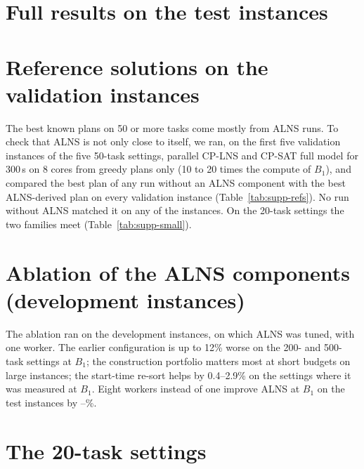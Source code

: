 \documentclass[10pt]{article}
\begin{document}
\section{Full results on the test instances}
\label{sec:s-full}



{\footnotesize\setlength{\tabcolsep}{3.4pt}}

\section{Reference solutions on the validation instances}
\label{sec:s-refs}



The best known plans on 50 or more tasks come mostly from ALNS runs. To check that ALNS is not only close to itself,
we ran, on the first five validation instances of the five 50-task settings, parallel CP-LNS and CP-SAT full model
for 300\,s on 8 cores from greedy plans only (10 to 20 times the compute of $B_1$), and compared the best plan of any
run without an ALNS component with the best ALNS-derived plan on every validation instance (Table~\ref{tab:supp-refs}). No run
without ALNS matched it on any of the \RefValInstances{} instances. On the 20-task settings the two families meet
(Table~\ref{tab:supp-small}).

\section{Ablation of the ALNS components (development instances)}
\label{sec:s-ablation}



The ablation ran on the development instances, on which ALNS was tuned, with one worker. The earlier configuration is up to 12\% worse on the
200- and 500-task settings at $B_1$; the construction portfolio matters most at short budgets on large instances; the
start-time re-sort helps by 0.4--2.9\% on the settings where it was measured at $B_1$. Eight workers instead of one
improve ALNS at $B_1$ on the test instances by \Workersgainlo--\Workersgainhi\%.

\section{The 20-task settings}
\label{sec:s-small}


\end{document}
